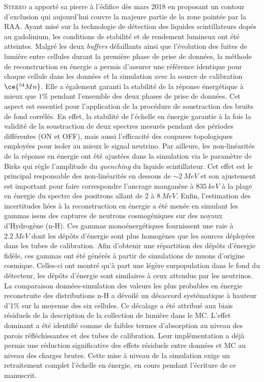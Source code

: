 \textsc{Stereo} a apporté sa pierre à l'édifice dès mars 2018 en proposant un contour d'exclusion qui aujourd'hui couvre la majeure partie de la zone pointée par la RAA. Ayant misé sur la technologie de détection des liquides scintillateurs dopés au gadolinium, les conditions de stabilité et de rendement lumineux ont été atteintes. Malgré les deux \textit{buffers} défaillants ainsi que l'évolution des fuites de lumière entre cellules durant la première phase de prise de données, la méthode de reconstruction en énergie a permis d'assurer une référence identique pour chaque cellule dans les données et la simulation avec la source de calibration $\ce{^{54}Mn}$. Elle a également garanti la stabilité de la réponse énergétique à mieux que $1\%$ pendant l'ensemble des deux phases de prise de données. Cet aspect est essentiel pour l'application de la procédure de soustraction des bruits de fond corrélés. En effet, la stabilité de l'échelle en énergie garantie à la fois la validité de la soustraction de deux spectres mesurés pendant des périodes différentes (ON et OFF), mais aussi l'efficacité des coupures topologiques employées pour isoler au mieux le signal neutrino. Par ailleurs, les non-linéarités de la réponse en énergie ont été ajustées dans la simulation via le paramètre de Birks qui règle l'amplitude du \textit{quenching} du liquide scintillateur. Cet effet est le principal responsable des non-linéarités en dessous de $\sim \SI{2}{MeV}$ et son ajustement est important pour faire correspondre l'ancrage manganèse à $\SI{835}{keV}$ à la plage en énergie du spectre des positrons allant de 2 à $\SI{8}{MeV}$. Enfin, l'estimation des incertitudes liées à la reconstruction en énergie a été menée en simulant les gammas issus des captures de neutrons cosmogéniques sur des noyaux d'Hydrogène (n-H). Ces gammas monoénergétiques fournissent une raie à $\SI{2.2}{MeV}$ dont les dépôts d'énergie sont plus homogènes que les sources déployées dans les tubes de calibration. Afin d'obtenir une répartition des dépôts d'énergie fidèle, ces gammas ont été générés à partir de simulations de muons d'origine cosmique. Celles-ci ont montré qu'à part une légère surpopulation dans le fond du détecteur, les dépôts d'énergie sont similaires à ceux attendus par les neutrinos. La comparaison données-simulation des valeurs les plus probables en énergie reconstruite des distributions n-H a dévoilé un désaccord systématique à hauteur d'1\% sur la moyenne des six cellules. Ce décalage a été attribué aux biais résiduels de la description de la collection de lumière dans le MC. L'effet dominant a été identifié comme de faibles termes d'absorption au niveau des parois réfléchissantes et des tubes de calibration. Leur implémentation a déjà permis une réduction significative des effets résiduels entre données et MC au niveau des charges brutes. Cette mise à niveau de la simulation exige un retraitement complet l'échelle en énergie, en cours pendant l'écriture de ce manuscrit.\\

